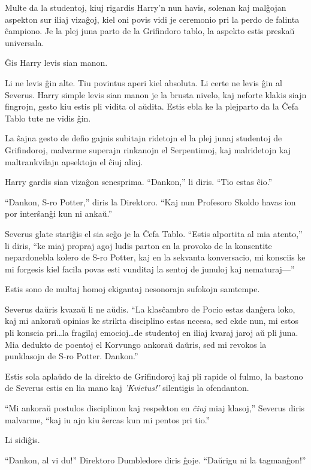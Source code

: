 Multe da la studentoj, kiuj rigardis Harry'n nun havis, solenan kaj
malĝojan aspekton sur iliaj vizaĝoj, kiel oni povis vidi je ceremonio
pri la perdo de falinta ĉampiono. Je la plej juna parto de la
Grifindoro tablo, la aspekto estis preskaŭ universala.

Ĝis Harry levis sian manon.

Li ne levis ĝin alte. Tiu povintus aperi kiel absoluta. Li certe ne levis
ĝin al Severus. Harry simple levis sian manon je la brusta nivelo, kaj
neforte klakis siajn fingrojn, gesto kiu estis pli vidita ol
aŭdita. Estis ebla ke la plejparto da la Ĉefa Tablo tute ne vidis ĝin.

La ŝajna gesto de defio gajnis subitajn ridetojn el la plej junaj
studentoj de Grifindoroj, malvarme superajn rinkanojn el Serpentimoj,
kaj malridetojn kaj maltrankvilajn apsektojn el ĉiuj aliaj.

Harry gardis sian vizaĝon senesprima. ``Dankon,'' li diris. ``Tio estas ĉio.''

``Dankon, S-ro Potter,'' diris la Direktoro. ``Kaj nun Profesoro
Skoldo havas ion por interŝanĝi kun ni ankaŭ.''

Severus glate stariĝis el sia seĝo je la Ĉefa Tablo. ``Estis alportita
al mia atento,'' li diris, ``ke miaj propraj agoj ludis parton en
la provoko de la konsentite nepardonebla kolero de S-ro Potter, kaj en la
sekvanta konversacio, mi konsciis ke mi forgesis kiel facila povas
esti vunditaj la sentoj de junuloj kaj nematuraj—''

Estis sono de multaj homoj ekigantaj nesonorajn sufokojn samtempe.

Severus daŭris kvazaŭ li ne aŭdis. ``La klasĉambro de Pocio estas
danĝera loko, kaj mi ankoraŭ opinias ke strikta disciplino estas
necesa, sed ekde nun, mi estos pli konscia pri\ldots la fragilaj
emocioj\ldots de studentoj en iliaj kvaraj jaroj aŭ pli juna. Mia
dedukto de poentoj el Korvungo ankoraŭ daŭris, sed mi revokos la
punklasojn de S-ro Potter. Dankon.''

Estis sola aplaŭdo de la direkto de Grifindoroj kaj pli rapide ol
fulmo, la bastono de Severus estis en lia mano kaj \emph{'Kvietus!'}
silentigis la ofendanton.

``Mi ankoraŭ postulos disciplinon kaj respekton en \emph{ĉiuj} miaj
klasoj,'' Severus diris malvarme, ``kaj iu ajn kiu ŝercas kun mi
pentos pri tio.''

Li sidiĝis.

``Dankon, al vi du!'' Direktoro Dumbledore diris ĝoje. ``Daŭrigu ni la tagmanĝon!''

